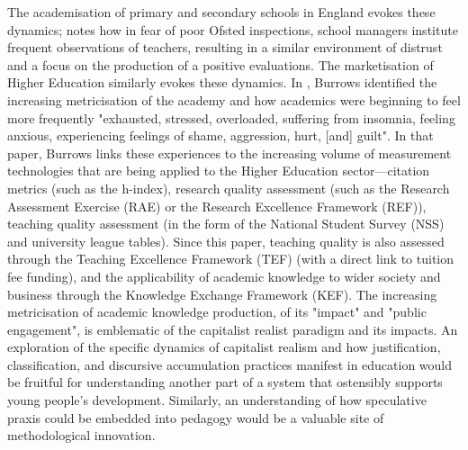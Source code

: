 The academisation of primary and secondary schools in England evokes these dynamics; \citet[p. 1118]{kauko_evaluation_2015} notes how in fear of poor Ofsted inspections, school managers institute frequent observations of teachers, resulting in a similar environment of distrust and a focus on the production of a positive evaluations. The marketisation of Higher Education similarly evokes these dynamics. In \citeyear[p. 355]{burrows_living_2012}, Burrows identified the increasing metricisation of the academy and how academics were beginning to feel more frequently "exhausted, stressed, overloaded, suffering from insomnia, feeling anxious, experiencing feelings of shame, aggression, hurt, [and] guilt". In that paper, Burrows links these experiences to the increasing volume of measurement technologies that are being applied to the Higher Education sector—citation metrics (such as the h-index), research quality assessment (such as the Research Assessment Exercise (RAE) or the Research Excellence Framework (REF)), teaching quality assessment (in the form of the National Student Survey (NSS) and university league tables). Since this paper, teaching quality is also assessed through the Teaching Excellence Framework (TEF) (with a direct link to tuition fee funding), and the applicability of academic knowledge to wider society and business through the Knowledge Exchange Framework (KEF). The increasing metricisation of academic knowledge production, of its "impact" and "public engagement", is emblematic of the capitalist realist paradigm and its impacts.  An exploration of the specific dynamics of capitalist realism and how justification, classification, and discursive accumulation practices manifest in education would be fruitful for understanding another part of a system that ostensibly supports young people's development. Similarly, an understanding of how speculative praxis could be embedded into pedagogy would be a valuable site of methodological innovation.

